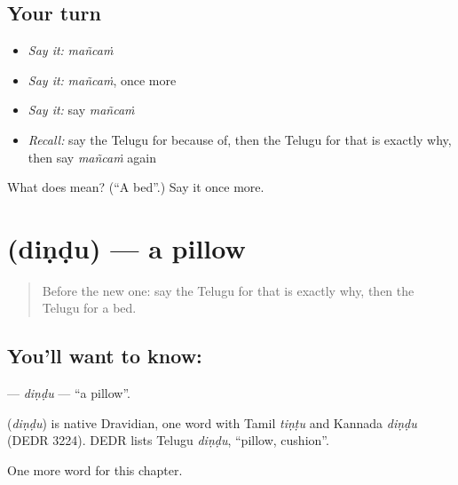 \subsection*{Your turn}
\begin{itemize}
\raggedright
  \item \emph{Say it:} \emph{mañcaṁ}
  \item \emph{Say it:} \emph{mañcaṁ}, once more
  \item \emph{Say it:} say \emph{mañcaṁ}
  \item \emph{Recall:} say the Telugu for because of, then the Telugu for that is exactly why, then say \emph{mañcaṁ} again
\end{itemize}

\begin{tcolorbox}[breakable,colback=teal!4,colframe=teal!35!black,title={Before you move on}]
What does  mean? (\textquotedblleft{}A bed\textquotedblright{}.) Say it once more.
\end{tcolorbox}
\section[\texorpdfstring{\te{దిండు} (diṇḍu)}{దిండు (diṇḍu)}]{ (diṇḍu) — a pillow}

\label{lesson:TE-C109-dindu}



\begin{quote}
Before the new one: say the Telugu for that is exactly why, then the Telugu for a bed.
\end{quote}

\subsection*{You'll want to know: }
\textbf{} — \emph{diṇḍu} — \textquotedblleft{}a pillow\textquotedblright{}.

\begin{cousinweb}
\textbf{} (\emph{diṇḍu}) is native Dravidian, one word with Tamil \emph{tiṇṭu} and Kannada \emph{diṇḍu} (DEDR 3224). DEDR lists Telugu \emph{diṇḍu}, \textquotedblleft{}pillow, cushion\textquotedblright{}.
\end{cousinweb}

\begin{grammarlens}[title={What you've built}]
One more word for this chapter.
\end{grammarlens}

